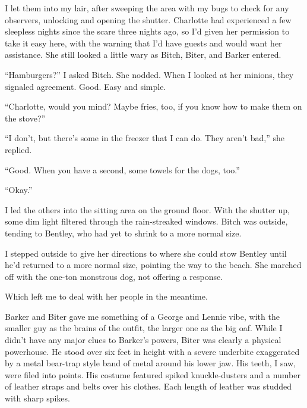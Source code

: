 I let them into my lair, after sweeping the area with my bugs to check for any observers, unlocking and opening the shutter.  Charlotte had experienced a few sleepless nights since the scare three nights ago, so I'd given her permission to take it easy here, with the warning that I'd have guests and would want her assistance.  She still looked a little wary as Bitch, Biter, and Barker entered.



``Hamburgers?'' I asked Bitch.  She nodded.  When I looked at her minions, they signaled agreement.  Good.  Easy and simple.



``Charlotte, would you mind?  Maybe fries, too, if you know how to make them on the stove?''



``I don't, but there's some in the freezer that I can do.  They aren't bad,'' she replied.



``Good.  When you have a second, some towels for the dogs, too.''



``Okay.''



I led the others into the sitting area on the ground floor.  With the shutter up, some dim light filtered through the rain-streaked windows.  Bitch was outside, tending to Bentley, who had yet to shrink to a more normal size.



I stepped outside to give her directions to where she could stow Bentley until he'd returned to a more normal size, pointing the way to the beach.  She marched off with the one-ton monstrous dog, not offering a response.



Which left me to deal with her people in the meantime.



Barker and Biter gave me something of a George and Lennie vibe, with the smaller guy as the brains of the outfit, the larger one as the big oaf.  While I didn't have any major clues to Barker's powers, Biter was clearly a physical powerhouse.  He stood over six feet in height with a severe underbite exaggerated by a metal bear-trap style band of metal around his lower jaw.  His teeth, I saw, were filed into points.  His costume featured spiked knuckle-dusters and a number of leather straps and belts over his clothes.  Each length of leather was studded with sharp spikes.



